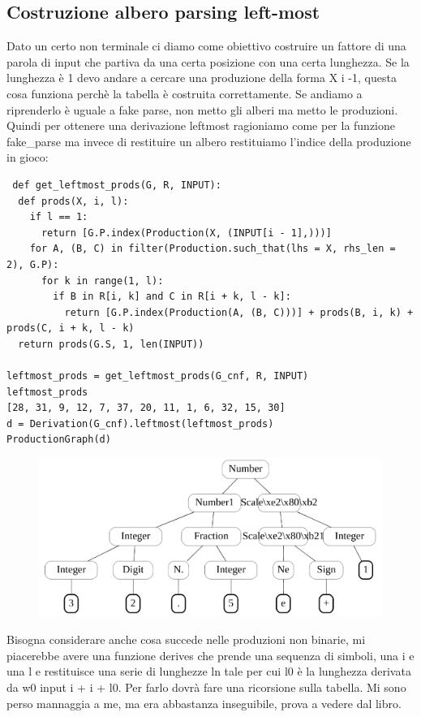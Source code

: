 \subsection{Costruzione albero parsing left-most}
Dato un certo non terminale ci diamo come obiettivo costruire un fattore di una parola di input che partiva da una certa posizione con una certa lunghezza.
Se la lunghezza è 1 devo andare a cercare una produzione della forma X i -1, questa cosa funziona perchè la tabella è costruita correttamente. Se andiamo a riprenderlo è uguale a fake parse, non metto gli alberi ma metto le produzioni. Quindi per ottenere una derivazione leftmost ragioniamo come per la funzione fake\_parse ma invece di restituire un albero restituiamo l'indice della produzione in gioco:
\begin{lstlisting}
 def get_leftmost_prods(G, R, INPUT):
  def prods(X, i, l):
    if l == 1:
      return [G.P.index(Production(X, (INPUT[i - 1],)))]
    for A, (B, C) in filter(Production.such_that(lhs = X, rhs_len = 2), G.P):
      for k in range(1, l):
        if B in R[i, k] and C in R[i + k, l - k]:
          return [G.P.index(Production(A, (B, C)))] + prods(B, i, k) + prods(C, i + k, l - k)
  return prods(G.S, 1, len(INPUT))     

leftmost_prods = get_leftmost_prods(G_cnf, R, INPUT)
leftmost_prods
[28, 31, 9, 12, 7, 37, 20, 11, 1, 6, 32, 15, 30]
d = Derivation(G_cnf).leftmost(leftmost_prods)
ProductionGraph(d)
\end{lstlisting}

\begin{figure}[ht!]
  \centering
  \includegraphics[scale=1]{images/Parsing/derivazioneLeftmostCMK.png}
\end{figure}

Bisogna considerare anche cosa succede nelle produzioni non binarie, mi piacerebbe avere una funzione derives che prende una sequenza di simboli, una i e una l e restituisce una serie di lunghezze ln tale per cui l0 è la lunghezza derivata da w0 input i + i + l0. Per farlo dovrà fare una ricorsione sulla tabella.
Mi sono perso mannaggia a me, ma era abbastanza inseguibile, prova a vedere dal libro.

